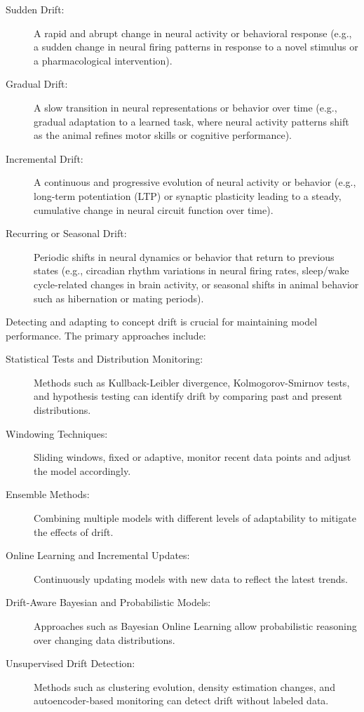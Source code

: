 \documentclass[12pt]{article}
\begin{document}
\begin{description}

    \item[Sudden Drift:] A rapid and abrupt change in neural activity or
        behavioral response (e.g., a sudden change in neural firing patterns in
        response to a novel stimulus or a pharmacological intervention).

    \item[Gradual Drift:] A slow transition in neural representations or
        behavior over time (e.g., gradual adaptation to a learned task, where
        neural activity patterns shift as the animal refines motor skills or
        cognitive performance).

    \item[Incremental Drift:] A continuous and progressive evolution of neural
        activity or behavior (e.g., long-term potentiation (LTP) or synaptic
        plasticity leading to a steady, cumulative change in neural circuit
        function over time).

    \item[Recurring or Seasonal Drift:] Periodic shifts in neural dynamics or
        behavior that return to previous states (e.g., circadian rhythm
        variations in neural firing rates, sleep/wake cycle-related changes in
        brain activity, or seasonal shifts in animal behavior such as
        hibernation or mating periods).

\end{description}

Detecting and adapting to concept drift is crucial for maintaining model
performance. The primary approaches include:

\begin{description}

    \item[Statistical Tests and Distribution Monitoring:] Methods such as
Kullback-Leibler divergence, Kolmogorov-Smirnov tests, and hypothesis testing
can identify drift by comparing past and present distributions.

    \item[Windowing Techniques:] Sliding windows, fixed or adaptive, monitor recent
data points and adjust the model accordingly.

    \item[Ensemble Methods:] Combining multiple models with different levels of
adaptability to mitigate the effects of drift.

    \item[Online Learning and Incremental Updates:] Continuously updating models
with new data to reflect the latest trends.

    \item[Drift-Aware Bayesian and Probabilistic Models:] Approaches such as
Bayesian Online Learning allow probabilistic reasoning over changing data
distributions.

    \item[Unsupervised Drift Detection:] Methods such as clustering evolution,
density estimation changes, and autoencoder-based monitoring can detect drift
without labeled data.

\end{description}
\end{document}
